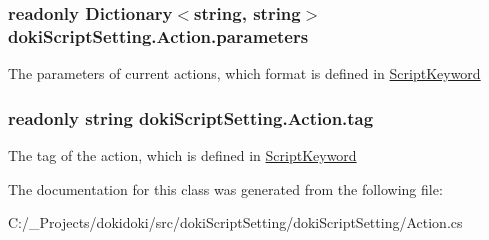 \subsubsection[{\texorpdfstring{parameters}{parameters}}]{\setlength{\rightskip}{0pt plus 5cm}readonly Dictionary$<$string, string$>$ doki\+Script\+Setting.\+Action.\+parameters}\hypertarget{classdoki_script_setting_1_1_action_ac01643b9ccadfc8c71dec610ac7bb611}{}\label{classdoki_script_setting_1_1_action_ac01643b9ccadfc8c71dec610ac7bb611}


The parameters of current actions, which format is defined in \hyperlink{classdoki_script_setting_1_1_script_keyword}{Script\+Keyword} 

\subsubsection[{\texorpdfstring{tag}{tag}}]{\setlength{\rightskip}{0pt plus 5cm}readonly string doki\+Script\+Setting.\+Action.\+tag}\hypertarget{classdoki_script_setting_1_1_action_a064f0ac6300b34990c22deec21c3b161}{}\label{classdoki_script_setting_1_1_action_a064f0ac6300b34990c22deec21c3b161}


The tag of the action, which is defined in \hyperlink{classdoki_script_setting_1_1_script_keyword}{Script\+Keyword} 



The documentation for this class was generated from the following file\+:\begin{DoxyCompactItemize}
\item 
C\+:/\+\_\+\+Projects/dokidoki/src/doki\+Script\+Setting/doki\+Script\+Setting/Action.\+cs\end{DoxyCompactItemize}
